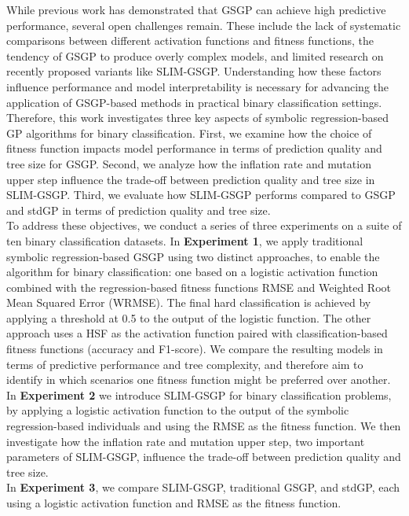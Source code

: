 \documentclass[manuscript, review, anonymous]{acmart} %
\begin{document}
While previous work has demonstrated that GSGP can achieve high predictive performance, 
several open challenges remain. 
These include the lack of systematic comparisons between different activation functions and fitness functions, 
the tendency of GSGP to produce overly complex models, 
and limited research on recently proposed variants like SLIM-GSGP. 
Understanding how these factors influence performance and model interpretability 
is necessary for advancing the application of GSGP-based methods in practical binary classification settings.\\
Therefore, this work investigates three key aspects of symbolic regression-based GP algorithms for binary classification.
First, we examine how the choice of fitness function impacts model performance in terms of prediction quality and tree size for GSGP.
Second, we analyze how the inflation rate and mutation upper step influence the trade-off between prediction quality and tree size in SLIM-GSGP.
Third, we evaluate how SLIM-GSGP performs compared to GSGP and stdGP in terms of prediction quality and tree size.\\
To address these objectives, 
we conduct a series of three experiments on a suite of ten binary classification datasets.
In \textbf{Experiment 1}, 
we apply traditional symbolic regression-based GSGP using two distinct approaches, to enable the algorithm for binary classification: 
one based on a logistic activation function combined with the regression-based fitness functions 
RMSE and Weighted Root Mean Squared Error (WRMSE). 
The final hard classification  is achieved by applying a threshold at 0.5 to the output of the logistic function.
The other approach uses a HSF as the activation 
function paired with classification-based fitness functions (accuracy and F1-score).
We compare the resulting models in terms of predictive performance and tree complexity,
and therefore aim to identify in which scenarios one fitness function might be preferred over another.\\
In \textbf{Experiment 2} we introduce SLIM-GSGP for binary classification problems, by 
applying a logistic activation function to the output of the symbolic regression-based individuals and using the RMSE as the fitness function.
We then investigate how the inflation rate and mutation upper step, two important parameters of SLIM-GSGP,
influence the trade-off between prediction quality and tree size.\\
In \textbf{Experiment 3}, we compare SLIM-GSGP, traditional GSGP, and stdGP, 
each using a logistic activation function and RMSE as the fitness function. 
\end{document}
